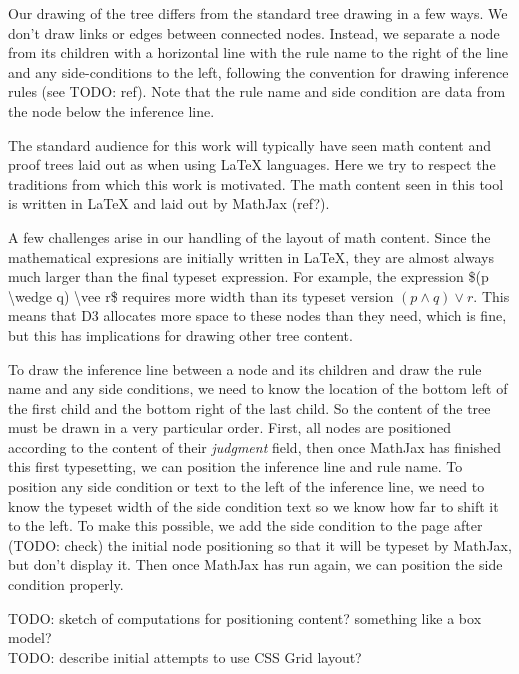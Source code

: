 \documentclass[conference]{IEEEtran}
\begin{document}
Our drawing of the tree differs from the standard tree drawing in a few ways. We don't draw links or edges between connected nodes. Instead, we separate a node from its children with a horizontal line with the rule name to the right of the line and any side-conditions to the left, following the convention for drawing inference rules (see TODO: ref). Note that the rule name and side condition are data from the node below the inference line.

The standard audience for this work will typically have seen math content and proof trees laid out as when using \LaTeX{} languages. Here we try to respect the traditions from which this work is motivated. The math content seen in this tool is written in \LaTeX{} and laid out by MathJax (ref?).

A few challenges arise in our handling of the layout of math content. Since the mathematical expresions are initially written in \LaTeX{}, they are almost always much larger than the final typeset expression. For example, the expression \$(p \textbackslash wedge q) \textbackslash vee r\$ requires more width than its typeset version $(p \wedge q) \vee r$. This means that D3 allocates more space to these nodes than they need, which is fine, but this has implications for drawing other tree content.

To draw the inference line between a node and its children and draw the rule name and any side conditions, we need to know the location of the bottom left of the first child and the bottom right of the last child. So the content of the tree must be drawn in a very particular order. First, all nodes are positioned according to the content of their \textit{judgment} field, then once MathJax has finished this first typesetting, we can position the inference line and rule name. To position any side condition or text to the left of the inference line, we need to know the typeset width of the side condition text so we know how far to shift it to the left. To make this possible, we add the side condition to the page after (TODO: check) the initial node positioning so that it will be typeset by MathJax, but don't display it. Then once MathJax has run again, we can position the side condition properly.

TODO: sketch of computations for positioning content? something like a box model? \\

TODO: describe initial attempts to use CSS Grid layout? \\
\end{document}
